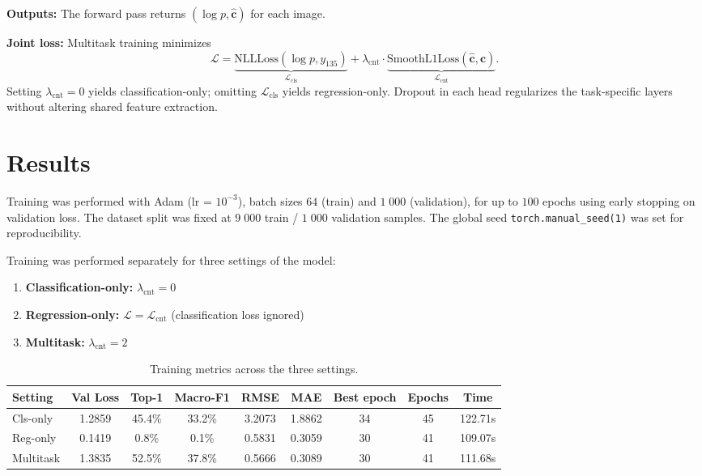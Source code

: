 \documentclass[11pt]{article}
\begin{document}
\textbf{Outputs:} The forward pass returns $(\log p,\hat{\mathbf c})$ for each image.

\textbf{Joint loss:} Multitask training minimizes
\[
\mathcal{L} = \underbrace{\text{NLLLoss}(\log p, y_{135})}_{\mathcal{L}_{\text{cls}}}
+ \lambda_{\text{cnt}}\cdot\underbrace{\text{SmoothL1Loss}(\hat{\mathbf c}, \mathbf c)}_{\mathcal{L}_{\text{cnt}}}.
\]
Setting $\lambda_{\text{cnt}}=0$ yields classification‑only; omitting $\mathcal{L}_{\text{cls}}$ yields regression‑only. Dropout in each head regularizes the task‑specific layers without altering shared feature extraction.

\section{Results}
Training was performed with Adam (lr = $10^{-3}$), batch sizes $64$ (train) and $1\;000$ (validation), for up to $100$ epochs using early stopping on validation loss. The dataset split was fixed at $9\;000$ train / $1\;000$ validation samples. The global seed \texttt{torch.manual\_seed(1)} was set for reproducibility.

Training was performed separately for three settings of the model:
\begin{enumerate}[label=(\arabic*)]
  \item \textbf{Classification-only:} $\lambda_{\text{cnt}}=0$
  \item \textbf{Regression-only:} $\mathcal{L} = \mathcal{L}_{\text{cnt}}$ (classification loss ignored)
  \item \textbf{Multitask:} $\lambda_{\text{cnt}}=2$
\end{enumerate}

\begin{table}[H]
  \centering
  \small
  \begin{tabular}{lcccccccc}
    \toprule
    \textbf{Setting} & \textbf{Val Loss} & \textbf{Top-1} & \textbf{Macro-F1} & \textbf{RMSE} & \textbf{MAE} & \textbf{Best epoch} & \textbf{Epochs} & \textbf{Time} \\
    \midrule
    Cls-only  & 1.2859 & 45.4\% & 33.2\% & 3.2073 & 1.8862 & 34 & 45 & 122.71s \\
    Reg-only  & 0.1419 &  0.8\% &  0.1\% & 0.5831 & 0.3059 & 30 & 41 & 109.07s \\
    Multitask & 1.3835 & 52.5\% & 37.8\% & 0.5666 & 0.3089 & 30 & 41 & 111.68s \\
    \bottomrule
  \end{tabular}
  \caption{Training metrics across the three settings.}
\end{table}
\end{document}
